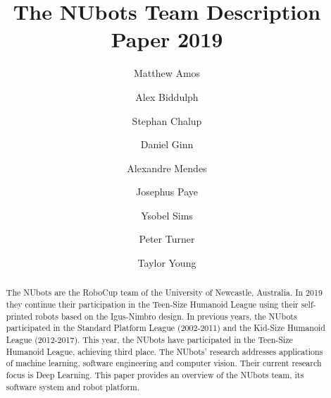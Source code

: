 \documentclass{llncs}
\begin{document}
%

\frontmatter          %
%
\pagestyle{headings}  %
%
%
\mainmatter              %
%
\title{The NUbots Team Description Paper 2019}
%

\author{Matthew Amos
        \and Alex Biddulph
        \and Stephan Chalup
        \and Daniel Ginn
		\and Alexandre Mendes
        \and Josephus Paye
        \and Ysobel Sims
        \and Peter Turner
        \and Taylor Young
        }

%
%

%
%

\maketitle              %


\begin{abstract}
The NUbots are the RoboCup team of the University of Newcastle, Australia. In 2019 they continue their participation in the Teen-Size Humanoid League using their self-printed robots based on the Igus-Nimbro design. In previous years, the NUbots participated in the Standard Platform League (2002-2011) and the Kid-Size Humanoid League (2012-2017). This year, the NUbots have participated in the Teen-Size Humanoid League, achieving third place. The NUbots' research addresses applications of machine learning, software engineering and computer vision. Their current research focus is Deep Learning. This paper provides an overview of the NUbots team, its software system and robot platform.
\end{abstract}
\end{document}
